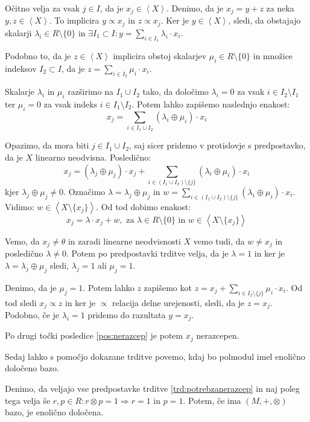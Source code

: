 \documentclass[mat1]{fmfdelo}
\newcommand{\Gen}[1]{\ensuremath{\left<{#1}\right>}}
\begin{document}
\begin{dokaz}
	Očitno velja za vsak $j\in I$, da je $x_j\in\Gen{X}$. Denimo, da je $x_j = y + z$ za neka $y, z\in\Gen{X}$. To implicira $y\varpropto x_j$ in $z\varpropto x_j$. 
	Ker je $y\in\Gen{X}$, sledi, da obstajajo skalarji $\lambda_i\in R\setminus\{0\}$ in $\exists I_1 \subset I: y = \sum_{i \in I_1}\lambda_i\cdot x_i$. 
	
	Podobno to, da je $z\in\Gen{X}$ implicira obstoj skalarjev $\mu_i\in R\setminus\{0\}$ in množice indeksov $I_2\subset I$, da je $z = \sum_{i\in I_2}\mu_i\cdot x_i$. 
	
	Skalarje $\lambda_i$ in $\mu_i$ razširimo na $I_1\cup I_2$ tako, da določimo $\lambda_i = 0$ za vsak $i\in I_2\setminus I_1$ ter $\mu_i = 0$ za vsak indeks $i\in I_1\setminus I_2$. Potem lahko zapišemo naslednjo enakost: $$x_j = \sum_{i\in I_1\cup I_2}(\lambda_i \oplus\mu_i)\cdot x_i$$
	
	Opazimo, da mora biti $j\in I_1\cup I_2$, saj sicer pridemo v protislovje s predpostavko, da je $X$ linearno neodvisna. Posledično: $$ x_j = (\lambda_j\oplus\mu_j)\cdot x_j + \sum_{i\in (I_1\cup I_2)\setminus\{j\}}(\lambda_i\oplus\mu_i)\cdot x_i $$
	kjer $\lambda_j\oplus\mu_j\neq 0$. Označimo $\lambda = \lambda_j\oplus\mu_j$ in $w = \sum_{i\in (I_1\cup I_2)\setminus\{j\}}(\lambda_i\oplus\mu_i)\cdot x_i$. Vidimo: $w\in\Gen{X\setminus\{x_j\}}$. Od tod dobimo enakost: $$x_j = \lambda\cdot x_j + w,\text{~za~} \lambda\in R\setminus\{0\}\text{~in~} w\in\Gen{X\setminus\{x_j\}} $$
	
	Vemo, da $x_j\neq \theta$ in zaradi linearne neodvisnosti $X$ vemo tudi, da $w\neq x_j$ in posledično $\lambda\neq 0$. Potem po predpostavki trditve velja, da je $\lambda = 1$ in ker je $\lambda = \lambda_j\oplus\mu_j$ sledi, $\lambda_j = 1$ ali $\mu_j = 1$. 
	
	Denimo, da je $\mu_j = 1$. Potem lahko $z$ zapišemo kot $z = x_j + \sum_{i\in I_2\setminus\{j\}}\mu_i\cdot x_i$. Od tod sledi $x_j\varpropto z$ in ker je $\varpropto$ relacija delne urejenosti, sledi, da je $z = x_j$. Podobno, če je $\lambda_i = 1$ pridemo do razultata $y = x_j$.
	
	Po drugi točki posledice \ref{pos:nerazcep} je potem $x_j$ nerazcepen.
\end{dokaz}

Sedaj lahko s pomočjo dokazane trditve povemo, kdaj bo polmodul imel enolično določeno bazo.

\begin{trditev}
	\label{trd:enoličbaza}
	Denimo, da veljajo vse predpostavke trditve \ref{trd:potrebzanerazcep} in naj poleg tega velja še $r, p\in R: r\otimes p = 1\Rightarrow r = 1$ in $p = 1$. Potem, če ima $(M, +, \otimes)$ bazo, je enolično določena.
\end{trditev}
\end{document}
